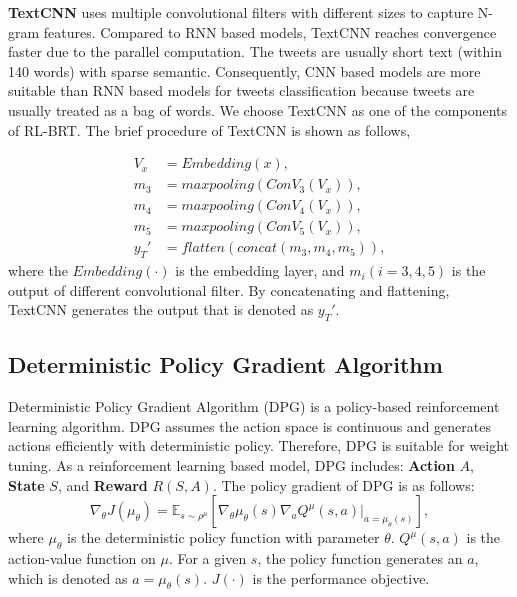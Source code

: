 \textbf{TextCNN} \cite{DBLP:conf/emnlp/Kim14} uses multiple convolutional filters with different sizes to capture N-gram features. Compared to RNN based models, TextCNN reaches convergence faster due to the parallel computation. The tweets are usually short text (within 140 words) with sparse semantic. Consequently, CNN based models are more suitable than RNN based models for tweets classification because tweets are usually treated as a bag of words. We choose TextCNN as one of the components of RL-BRT. The brief procedure of TextCNN is shown as follows,

\begin{align}\label{eq:tcnn}
V_x &= Embedding(x), \\
m_3 &= maxpooling(ConV_3(V_x)),\\
m_4 &= maxpooling(ConV_4(V_x)),\\
m_5 &= maxpooling(ConV_5(V_x)),\\
y_T' &= flatten(concat(m_3, m_4, m_5)),
\end{align}
where the $Embedding(\cdot)$ is the embedding layer, and $m_i (i = 3,4,5)$ is the output of different convolutional filter. By concatenating and flattening, TextCNN generates the output that is denoted as $y_T'$.

\subsection{Deterministic Policy Gradient Algorithm}
Deterministic Policy Gradient Algorithm (DPG) \cite{DBLP:conf/icml/SilverLHDWR14} is a policy-based reinforcement learning algorithm. DPG assumes the action space is continuous and generates actions efficiently with deterministic policy. Therefore, DPG is suitable for weight tuning. As a reinforcement learning based model, DPG includes: \textbf{Action} $A$, \textbf{State} $S$, and \textbf{Reward} $R(S,A)$. The policy gradient of DPG is as follows:
\begin{equation}
\nabla_\theta J(\mu_\theta) =  \mathbb{E}_{s \sim \rho^\mu} \left[\nabla_\theta \mu_\theta (s)\nabla_a Q^\mu (s, a) |_{a = \mu_\theta(s)}  \right],
\end{equation}
where $\mu_\theta$ is the deterministic policy function with parameter $\theta$. $Q^\mu(s, a)$ is the action-value function on $\mu$. For a given $s$, the policy function generates an $a$, which is denoted as $a=\mu_\theta(s)$. $J(\cdot)$ is the performance objective.
